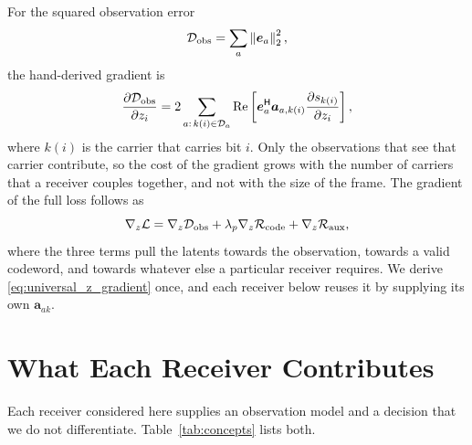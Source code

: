\documentclass[11pt]{article}
\newcommand{\Hh}{^{\mathsf H}}
\newcommand{\norm}[1]{\left\lVert #1 \right\rVert}
\newcommand{\Ree}{\operatorname{Re}}
\begin{document}
For the squared observation error
\begin{equation}
  \mathcal D_{\rm obs}=\sum_a \norm{\bm e_a}_2^2,
\end{equation}
the hand-derived gradient is
\begin{equation}
  \frac{\partial \mathcal D_{\rm obs}}{\partial z_i}
  =
  2\sum_{a:\,k(i)\in\mathcal D_a}
  \Ree\left[
    \bm e_a\Hh \bm a_{a,k(i)}
    \frac{\partial s_{k(i)}}{\partial z_i}
  \right],
  \label{eq:universal_z_gradient}
\end{equation}
where $k(i)$ is the carrier that carries bit $i$.  Only the observations that
see that carrier contribute, so the cost of the gradient grows with the number
of carriers that a receiver couples together, and not with the size of the
frame.  The gradient of the full loss follows as
\begin{equation}
  \nabla_z\mathcal L
  =
  \nabla_z\mathcal D_{\rm obs}
  +\lambda_p\nabla_z\mathcal R_{\rm code}
  +\nabla_z\mathcal R_{\rm aux},
  \label{eq:full_z_gradient}
\end{equation}
where the three terms pull the latents towards the observation, towards a valid
codeword, and towards whatever else a particular receiver requires.  We derive
\eqref{eq:universal_z_gradient} once, and each receiver below reuses it by
supplying its own $\bm a_{ak}$.

\section{What Each Receiver Contributes}

Each receiver considered here supplies an observation model and a decision that
we do not differentiate.  Table~\ref{tab:concepts} lists both.
\end{document}
